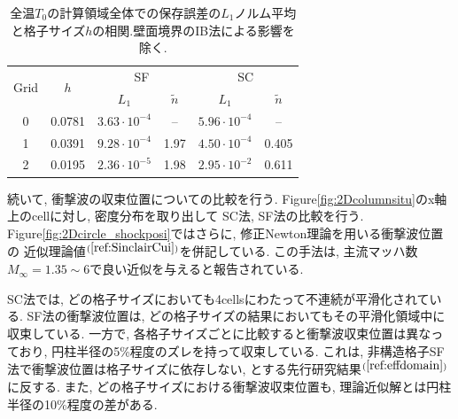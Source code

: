 \documentclass[a4j]{jarticle}
\begin{document}
\begin{table}[h]
  \centering
  \caption{全温$T_0$の計算領域全体での保存誤差の$L_1$ノルム平均と格子サイズ$h$の相関.壁面境界のIB法による影響を除く.}
  \begin{tabular}{cccccc}
    \toprule
    \multirow{2}{*}{Grid} & \multirow{2}{*}{$h$}
    & \multicolumn{2}{c}{SF} & \multicolumn{2}{c}{SC} \\
    \cmidrule(lr){3-4} \cmidrule(lr){5-6}
    & & $L_1$ & $\tilde{n}$ & $L_1$ & $\tilde{n}$ \\
    \midrule
    0 & 0.0781 & $3.63 \cdot 10^{-4}$ & –    & $5.96 \cdot 10^{-4}$ & – \\
    1 & 0.0391 & $9.28 \cdot 10^{-4}$ & 1.97 & $4.50 \cdot 10^{-4}$ & 0.405 \\
    2 & 0.0195 & $2.36 \cdot 10^{-5}$ & 1.98 & $2.95 \cdot 10^{-2}$ & 0.611 \\
    \bottomrule
  \end{tabular} 
  \label{tab:2D_circle_global_error_arranged}
\end{table}


続いて, 衝撃波の収束位置についての比較を行う.
Figure\ref{fig:2Dcolumnsitu}のx軸上のcellに対し, 密度分布を取り出して
SC法, SF法の比較を行う.
Figure\ref{fig:2Dcircle_shockposi}ではさらに, 修正Newton理論を用いる衝撃波位置の
近似理論値$^{(\ref{ref:SinclairCui})}$を併記している. この手法は,
主流マッハ数$M_\infty = 1.35 \sim 6$で良い近似を与えると報告されている.

SC法では, どの格子サイズにおいても4cellsにわたって不連続が平滑化されている.
SF法の衝撃波位置は, どの格子サイズの結果においてもその平滑化領域中に収束している.
一方で, 各格子サイズごとに比較すると衝撃波収束位置は異なっており,
円柱半径の5\%程度のズレを持って収束している.
これは, 非構造格子SF法で衝撃波位置は格子サイズに依存しない, とする先行研究結果$^{(\ref{ref:effdomain})}$に反する.
また, どの格子サイズにおける衝撃波収束位置も, 理論近似解とは円柱半径の10\%程度の差がある.
\end{document}
